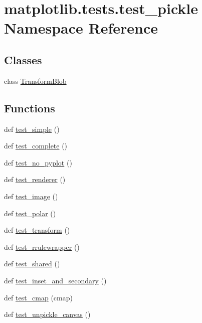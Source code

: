 \hypertarget{namespacematplotlib_1_1tests_1_1test__pickle}{}\section{matplotlib.\+tests.\+test\+\_\+pickle Namespace Reference}
\label{namespacematplotlib_1_1tests_1_1test__pickle}
\subsection*{Classes}
\begin{DoxyCompactItemize}
\item 
class \hyperlink{classmatplotlib_1_1tests_1_1test__pickle_1_1TransformBlob}{Transform\+Blob}
\end{DoxyCompactItemize}
\subsection*{Functions}
\begin{DoxyCompactItemize}
\item 
def \hyperlink{namespacematplotlib_1_1tests_1_1test__pickle_a1298c78cb4cdf66c38bd0f054fb45128}{test\+\_\+simple} ()
\item 
def \hyperlink{namespacematplotlib_1_1tests_1_1test__pickle_afa9bd85a65c3356435941c653d40b019}{test\+\_\+complete} ()
\item 
def \hyperlink{namespacematplotlib_1_1tests_1_1test__pickle_a09f43c51f37851448b2fbb86f3905279}{test\+\_\+no\+\_\+pyplot} ()
\item 
def \hyperlink{namespacematplotlib_1_1tests_1_1test__pickle_a175220d2a400a01cd4a479142258c63d}{test\+\_\+renderer} ()
\item 
def \hyperlink{namespacematplotlib_1_1tests_1_1test__pickle_afa155e235f77fe1265424d93dab378cf}{test\+\_\+image} ()
\item 
def \hyperlink{namespacematplotlib_1_1tests_1_1test__pickle_ab0eec3f43148bbe289a9996d1ef29d8e}{test\+\_\+polar} ()
\item 
def \hyperlink{namespacematplotlib_1_1tests_1_1test__pickle_a70219194f7acae4ca5072dc2234d4021}{test\+\_\+transform} ()
\item 
def \hyperlink{namespacematplotlib_1_1tests_1_1test__pickle_aaf8051b0c5f40b1763a8a6ef89ef1506}{test\+\_\+rrulewrapper} ()
\item 
def \hyperlink{namespacematplotlib_1_1tests_1_1test__pickle_a6880e01a221ec7802d49c12e96257b81}{test\+\_\+shared} ()
\item 
def \hyperlink{namespacematplotlib_1_1tests_1_1test__pickle_a34f97627c522a8c004409d5429b19b7b}{test\+\_\+inset\+\_\+and\+\_\+secondary} ()
\item 
def \hyperlink{namespacematplotlib_1_1tests_1_1test__pickle_aff45d28ef30274b20db28d0f98d11b8a}{test\+\_\+cmap} (cmap)
\item 
def \hyperlink{namespacematplotlib_1_1tests_1_1test__pickle_ad2c5eb23049ed1da11eee3f8dfa25e03}{test\+\_\+unpickle\+\_\+canvas} ()
\end{DoxyCompactItemize}



